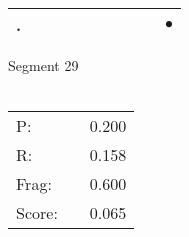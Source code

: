 \documentclass[landscape]{article}
\newcommand{\ssp}{\hspace{2pt}}
\newcommand{\mex}{\cellcolor{g}$\bullet$}
\begin{document}
\begin{tabular}{|l|p{10pt}|p{10pt}|p{10pt}|p{10pt}|p{10pt}|p{10pt}|p{10pt}|p{10pt}|p{10pt}|}
\hline
\ssp \cellcolor{ref8}. \ssp&\hspace{2pt}&\hspace{2pt}&\hspace{2pt}&\hspace{2pt}&\hspace{2pt}&\hspace{2pt}&\hspace{2pt}&\hspace{2pt}&\hspace{2pt}\mex\\
\hline
\end{tabular}

\vspace{6pt}
\noindent Segment 29\\\\
\noindent\begin{tabular}{lm{12pt}r}
\hline
P:&&0.200\\
R:&&0.158\\
Frag:&&0.600\\
Score:&&0.065\\
\end{tabular}

\newpage
\end{document}
